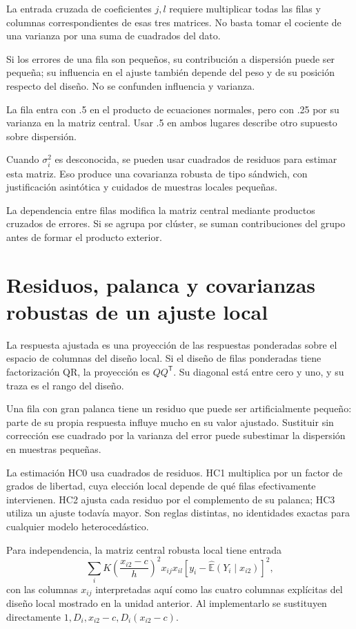 \documentclass[11pt,a4paper]{article}
\newcommand{\E}{\mathbb E}
\newcommand{\T}{^{\mathsf T}}
\begin{document}
La entrada cruzada de coeficientes \(j,l\)
requiere multiplicar todas las filas y
columnas correspondientes de esas tres matrices.
No basta tomar el cociente de una varianza
por una suma de cuadrados del dato.

Si los errores de una fila son pequeños,
su contribución a dispersión puede ser pequeña;
su influencia en el ajuste también depende
del peso y de su posición respecto del diseño.
No se confunden influencia y varianza.

\begin{ejemplo}[Un peso .5]
La fila entra con .5 en el producto de
ecuaciones normales, pero con .25
por su varianza en la matriz central.
Usar .5 en ambos lugares describe
otro supuesto sobre dispersión.
\end{ejemplo}
Cuando \(\sigma_i^2\) es desconocida,
se pueden usar cuadrados de residuos
para estimar esta matriz.
Eso produce una covarianza robusta de tipo
sándwich, con justificación asintótica
y cuidados de muestras locales pequeñas.

La dependencia entre filas modifica
la matriz central mediante productos
cruzados de errores.
Si se agrupa por clúster, se suman
contribuciones del grupo antes de
formar el producto exterior.

\clearpage
\section{Residuos, palanca y covarianzas robustas de un ajuste local}\label{unidad30}
La respuesta ajustada es una proyección
de las respuestas ponderadas sobre el
espacio de columnas del diseño local.
Si el diseño de filas ponderadas tiene
factorización QR, la proyección es \(QQ\T\).
Su diagonal está entre cero y uno,
y su traza es el rango del diseño.

Una fila con gran palanca tiene
un residuo que puede ser artificialmente pequeño:
parte de su propia respuesta influye
mucho en su valor ajustado.
Sustituir sin corrección ese cuadrado
por la varianza del error puede
subestimar la dispersión en muestras pequeñas.

La estimación HC0 usa cuadrados de residuos.
HC1 multiplica por un factor de grados
de libertad, cuya elección local depende
de qué filas efectivamente intervienen.
HC2 ajusta cada residuo por el
complemento de su palanca;
HC3 utiliza un ajuste todavía mayor.
Son reglas distintas, no identidades exactas
para cualquier modelo heterocedástico.

Para independencia, la matriz central
robusta local tiene entrada
\[
\sum_i K\left(\frac{x_{i2}-c}{h}\right)^2
x_{ij}x_{il}
\left[y_i-\widehat{\E}(Y_i\mid x_{i2})\right]^2,
\]
con las columnas \(x_{ij}\) interpretadas
aquí como las cuatro columnas explícitas
del diseño local mostrado en la unidad anterior.
Al implementarlo se sustituyen directamente
\(1,D_i,x_{i2}-c,D_i(x_{i2}-c)\).
\end{document}
